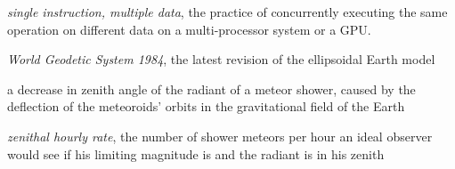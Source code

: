 \begin{description}[labelindent=0mm, leftmargin=40mm]
        \emph{single instruction, multiple data}, the practice of concurrently executing the same operation on
        different data on a multi-processor system or a GPU.
    \item[WGS84]
        \emph{World Geodetic System 1984}, the latest revision of the ellipsoidal Earth model \citep{nima-wgs84}
    \item[zenith attraction]
        a decrease in zenith angle of the radiant of a meteor shower, caused by the deflection of the meteoroids' orbits in the
        gravitational field of the Earth \citep{lovell1954}
    \item[ZHR]
        \emph{zenithal hourly rate}, the number of shower meteors per hour an ideal observer would see
            if his limiting magnitude is  and the radiant is in his zenith \citep{imo-glossary}
\end{description}
